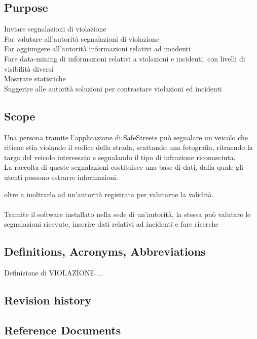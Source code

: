 \documentclass{article}
\begin{document}
        \subsection{Purpose}
            Inviare segnalazioni di violazione\\
            Far valutare all'autorità segnalazioni di violazione\\
            Far aggiungere all'autorità informazioni relativi ad incidenti\\
            Fare data-mining di informazioni relativi a violazioni e incidenti, con livelli di visibilità diversi\\
            Mostrare statistiche\\
            Suggerire alle autorità soluzioni per contrastare violazioni ed incidenti\\

        \subsection{Scope}
            Una persona tramite l'applicazione di SafeStreets può segnalare un veicolo che ritiene stia violando il codice della strada, scattando una fotografia, ritraendo la targa del veicolo interessato e segnalando il tipo di infrazione riconosciuta. \\
            La raccolta di queste segnalazioni costituisce una base di dati, dalla quale gli utenti possono estrarre informazioni.
            
            oltre a inoltrarla ad un'autorità registrata per valutarne la validità.\\\\
            
            Tramite il software installato nella sede di un'autorità, la stessa può valutare le segnalazioni ricevute, inserire dati relativi ad incidenti
            e fare ricerche
            
            
        \subsection{Definitions, Acronyms, Abbreviations}
            Definizione di 
            VIOLAZIONE
            ...
        \subsection{Revision history}
        \subsection{Reference Documents}
\end{document}
